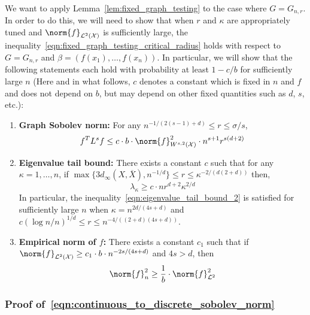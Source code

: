 \documentclass{article}
\newcommand{\1}{\mathbf{1}}
\newcommand{\Xset}{\mathcal{X}}
\newcommand{\Leb}{\mathcal{L}}
\newcommand{\ol}[1]{\overline{#1}}
\theoremstyle{alden}
\theoremstyle{aldenthm}
\theoremstyle{definition}
\theoremstyle{remark}
\begin{document}
We want to apply Lemma~\ref{lem:fixed_graph_testing} to the case where $G = G_{n,r}$. In order to do this, we will need to show that when $r$ and $\kappa$ are appropriately tuned and $\norm{f}_{\Leb^2(\mathcal{X})}$ is sufficiently large, the inequality~\eqref{eqn:fixed_graph_testing_critical_radius} holds with respect to $G = G_{n,r}$ and $\beta = (f(x_1),\ldots,f(x_n))$. In particular, we will show that the following statements each hold with probability at least $1 - c/b$ for sufficiently large $n$ (Here and in what follows, $c$ denotes a constant which is fixed in $n$ and $f$ and does not depend on $b$, but may depend on other fixed quantities such as $d$, $s$, etc.): 
\begin{enumerate}[label=(E\arabic*)]
	\item 
	\label{event:discrete_sobolev_norm}
	\textbf{Graph Sobolev norm:} For any $n^{-1/(2(s - 1) + d)}\leq r \leq \sigma/s$,
	\begin{equation}
	\label{eqn:continuous_to_discrete_sobolev_norm}
	f^T L^s f \leq c \cdot b \cdot \norm{f}_{W^{s,2}(\Xset)}^2 \cdot n^{s + 1} r^{s(d + 2)} 
	\end{equation}
	\item 
	\label{event:eigenvalue_tail_decay_2}
	\textbf{Eigenvalue tail bound:} There exists a constant $c$ such that for any $\kappa = 1,\ldots,n$, if $\max\{ 3 d_{\infty}(X,\ol{X}),n^{-1/d}\} \leq r \leq \kappa^{-2/(d(2 +d))}$ then,
	\begin{equation}
	\label{eqn:eigenvalue_tail_bound_2}
	\lambda_{\kappa} \geq c \cdot n r^{d + 2} \kappa^{2/d}
	\end{equation}
	In particular, the inequality~\eqref{eqn:eigenvalue_tail_bound_2} is satisfied for sufficiently large $n$ when $\kappa = n^{2d/(4s + d)}$ and $c(\log n/n)^{1/d} \leq r \leq n^{-4/((2+d)(4s + d))}$. 
	\item 
	\label{event:l2_norm_order1}
	\textbf{Empirical norm of $f$:} There exists a constant $c_1$ such that if $\norm{f}_{\Leb^2(\Xset)} \geq c_1 \cdot b \cdot n^{-2s/(4s + d)}$ and $4s > d$, then
	\begin{equation}
	\label{eqn:l2_to_empirical_norm_order1}
	\norm{f}_n^2 \geq \frac{1}{b} \cdot \norm{f}_{\Leb^2}^2
	\end{equation}
\end{enumerate} 

\subsubsection{Proof of~\eqref{eqn:continuous_to_discrete_sobolev_norm}}
\end{document}
